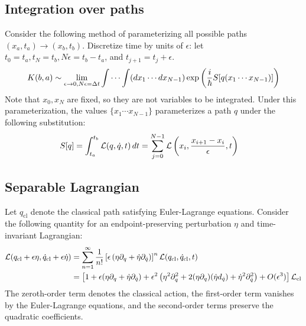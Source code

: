 \subsection{Integration over paths}
Consider the following method of parameterizing all possible paths $(x_a, t_a)\to (x_b, t_b)$. 
Discretize time by units of $\epsilon$: let $t_0=t_a, t_N=t_b, N\epsilon = t_b-t_a$, and $t_{j+1}=t_j+\epsilon$. 
\begin{equation}
    K(b, a)\sim \lim_{\epsilon \to 0, N\epsilon = \Delta t}\int\cdots \int (dx_1\cdots dx_{N-1}) \exp\left(\dfrac i {\hbar} S[q(x_1\cdots x_{N-1})]\right)
\end{equation}
Note that $x_0, x_N$ are fixed, so they are not variables to be integrated. 
Under this parameterization, the values $\{x_1\cdots x_{N-1}\}$ parameterizes a path $q$ under the following substitution:
\begin{equation}\begin{aligned}
    S[q]&=\int_{t_a}^{t_b}\mathcal L(q, \dot q, t)\, dt = \sum_{j=0}^{N-1}\mathcal L\left(x_i, \dfrac{x_{i+1}-x_i}{\epsilon}, t\right)
\end{aligned}\end{equation}

\subsection{Separable Lagrangian}
Let $q_{\mathrm{cl}}$ denote the classical path satisfying Euler-Lagrange equations. 
Consider the following quantity for an endpoint-preserving perturbation $\eta$ and time-invariant Lagrangian: 
\begin{equation}
\begin{aligned}
    \mathcal L(q_{\mathrm{cl}}+\epsilon \eta, \dot q_{\mathrm{cl}}+\epsilon \dot \eta)  
    &= \sum_{n=1}^\infty \dfrac 1 {n!} \left[\epsilon \left(\eta \partial_{q} + \dot \eta \partial_{\dot q}\right)\right]^n \mathcal L(q_{\mathrm{cl}}, \dot q_{\mathrm{cl}}, t) \\ 
    &= \left[1 + 
        \epsilon (\eta \partial_{q} + \dot \eta \partial_{\dot q}) + 
        \epsilon^2\left(\eta^2 \partial_{q}^2 + 2(\eta \partial_{q})(\dot \eta d_{\dot q}) + \dot \eta^2 \partial_{\dot q}^2\right)
        +O(\epsilon^3)\right]\mathcal L_{\mathrm{cl}}
\end{aligned} 
\end{equation}
The zeroth-order term denotes the classical action, the first-order term vanishes by the 
Euler-Lagrange equations, and the second-order terms preserve the quadratic coefficients. 

